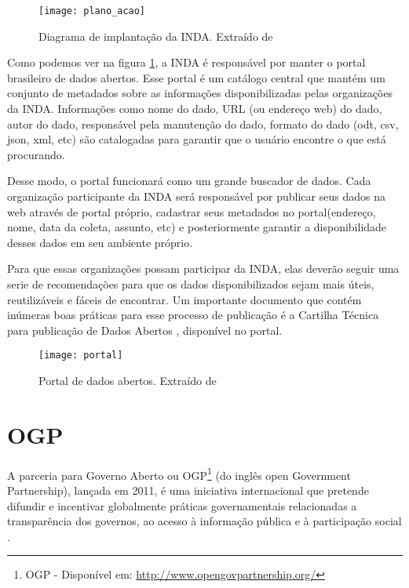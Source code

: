 \graphicspath{{figuras/}}
\begin{figure}[H]
\centering
\texttt{[image: plano\_acao]}
\caption[Diagrama de implantação da INDA.]{Diagrama de implantação da INDA. Extraído de \cite{planoinda}}
\label{plano_acao}
\end{figure}

Como podemos ver na figura \ref{plano_acao}, a INDA é responsável por manter o portal brasileiro de dados abertos. Esse portal é um catálogo central que mantém um conjunto de metadados sobre as informações disponibilizadas pelas organizações da INDA. Informações como nome do dado, URL (ou endereço web) do dado, autor do dado, responsável pela manutenção do dado, formato do dado (odt, csv, json, xml, etc) são catalogadas para garantir que o usuário encontre o que está procurando. 

Desse modo, o portal funcionará como um grande buscador de dados. Cada organização participante da INDA será responsável por publicar seus dados na web através de portal próprio, cadastrar seus metadados no portal(endereço, nome, data da coleta, assunto, etc) e posteriormente garantir a disponibilidade desses dados em seu ambiente próprio.

Para que essas organizações possam participar da INDA, elas deverão seguir uma serie de recomendações para que os dados disponibilizados sejam mais úteis, reutilizáveis e fáceis de encontrar. Um importante documento que contém inúmeras boas práticas para esse processo de publicação é a Cartilha Técnica 	para publicação de Dados Abertos \cite{cartilha}, disponível no portal.

\graphicspath{{figuras/}}
\begin{figure}[H]
\centering
\texttt{[image: portal]}
\caption[Portal de dados abertos.]{Portal de dados abertos. Extraído de \cite{dadosabertos} }
\label{portal}
\end{figure}

\section{OGP}
\label{sec-padroes-sl} 

A parceria para Governo Aberto ou OGP\footnote{OGP - Disponível em: \url{http://www.opengovpartnership.org/}} (do inglês open Government Partnership), lançada em 2011, é uma iniciativa internacional que pretende difundir e incentivar globalmente práticas governamentais relacionadas a transparência dos governos, ao acesso à informação pública e à participação social \cite{mapaogp}.

